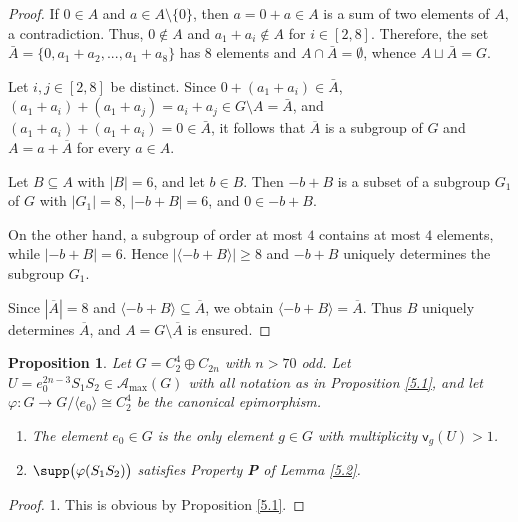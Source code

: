 \documentclass[a4paper, 10pt]{amsart}
\theoremstyle{plain}
\newtheorem{proposition}[theorem]{\bf Proposition}
\theoremstyle{definition}
\numberwithin{equation}{section}
\begin{document}
{\begin{proof}
If $0\in A$ and $a \in A \setminus \{0\}$, then $a=0+a\in A$ is a sum of two elements of $A$, a contradiction.
Thus,  $0\notin A$ and $a_1+a_i\notin A$ for $i \in [2,8]$. Therefore, the set $\bar{A}=\{0,a_1+a_2,...,a_1+a_8 \}$ has $8$ elements and $A \cap \bar A=\emptyset$, whence  $A\sqcup \bar{A}=G$. 

Let $i, j \in [2,8]$ be distinct. Since $0+(a_1+a_i)\in \bar{A}$,  $(a_1+a_i)+(a_1+a_j)=a_i+a_j \in G \setminus A =  \bar{A}$, and $(a_1+a_i)+(a_1+a_i)=0\in \bar{A}$, it follows that $\overline{A}$ is a subgroup of $G$ and $A = a + \overline A$ for every $a \in A$.


Let $B \subseteq A$ with $|B|=6$, and let $b \in B$. Then $-b+B$ is a subset of a subgroup $G_1$ of $G$ with $|G_1|=8$, $|-b+B|=6$, and $0 \in -b+B$.

	On the other hand, a subgroup of order at most $4$
	contains at most $4$ elements, while $|-b+B|=6$.
	Hence $|\langle -b+B\rangle|\ge 8$ and $-b+B$ uniquely determines the subgroup $G_1$.
	
	Since $|\overline A|=8$ and $\langle -b+B\rangle \subseteq \overline A$, we obtain
	$\langle -b+B\rangle=\overline A$.
	Thus $B$ uniquely determines $\overline A$, and $A=G\setminus \overline A$ is ensured.
\end{proof}


\begin{proposition} \label{5.3}
Let $G = C_2^4 \oplus C_{2n}$ with $n>70$  odd. Let $U = e_0^{2n-3}S_1S_2 \in \mathcal A_{\max} (G)$ with all notation as in Proposition \ref{5.1}, and let  $\varphi \colon G\to G/\langle e_0 \rangle \cong C_2^4$ be the canonical epimorphism.
\begin{enumerate}
\item The element $e_0 \in G$ is the only element $g \in G$ with multiplicity $\mathsf v_g (U) > 1$.
		
\item $\supp \big( \varphi(S_1S_2) \big)$ satisfies Property {\bf P} of Lemma \ref{5.2}.
\end{enumerate}
\end{proposition}

\begin{proof}
1. This is obvious by Proposition \ref{5.1}.
	

\end{proof}}
\end{document}
